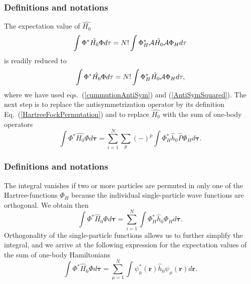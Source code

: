\documentclass[compress]{beamer}
\begin{document}
\frame
{
  \frametitle{Definitions and notations}
\begin{small}
{\scriptsize
The expectation value of $\hat{H_0}$ 
\[
  \int \Phi^*\hat{H_0}\Phi d\mathbf{\tau} 
  = N! \int \Phi_H^*{\cal A}\hat{H_0}{\cal A}\Phi_H d\mathbf{\tau}
\]
is readily reduced to
\[
  \int \Phi^*\hat{H_0}\Phi d\mathbf{\tau} 
  = N! \int \Phi_H^*\hat{H_0}{\cal A}\Phi_H d\mathbf{\tau},
\]
where we have used eqs.~(\ref{cummutionAntiSym}) and
(\ref{AntiSymSquared}). The next step is to replace the antisymmetrization
operator by its definition Eq.~(\ref{HartreeFockPermutation}) and to
replace $\hat{H_0}$ with the sum of one-body operators
\[
  \int \Phi^*\hat{H_0}\Phi  d\mathbf{\tau}
  = \sum_{i=1}^N \sum_{p} (-)^p\int 
  \Phi_H^*\hat{h}_0\hat{P}\Phi_H d\mathbf{\tau}.
\]

}
\end{small}
}

\frame
{
  \frametitle{Definitions and notations}
\begin{small}
{\scriptsize
The integral vanishes if two or more particles are permuted in only one
of the Hartree-functions $\Phi_H$ because the individual single-particle wave functions are
orthogonal. We obtain then
\[
  \int \Phi^*\hat{H}_0\Phi  d\mathbf{\tau}= \sum_{i=1}^N \int \Phi_H^*\hat{h}_0\Phi_H  d\mathbf{\tau}.
\]
Orthogonality of the single-particle functions allows us to further simplify the integral, and we
arrive at the following expression for the expectation values of the
sum of one-body Hamiltonians 
\begin{equation}
  \int \Phi^*\hat{H}_0\Phi  d\mathbf{\tau}
  = \sum_{\mu=1}^N \int \psi_{\mu}^*(\mathbf{r})\hat{h}_0\psi_{\mu}(\mathbf{r})
  d\mathbf{r}.
  \label{H1Expectation}
\end{equation}

}
\end{small}
}
\end{document}
